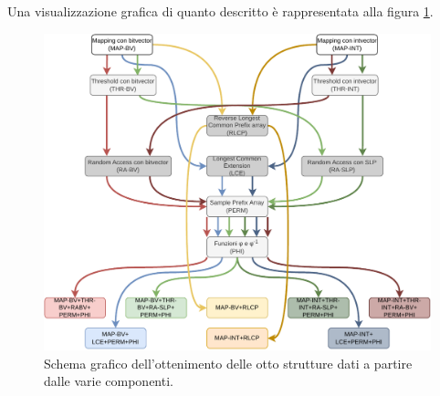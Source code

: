 Una visualizzazione grafica di quanto descritto è rappresentata alla figura
\ref{fig:compon}.
\begin{figure}
  \centering
  \includegraphics[width=\textwidth]{img/ds.pdf}
  \vspace{-5mm}
  \caption{Schema grafico dell'ottenimento delle otto strutture dati a partire
    dalle varie componenti.}
  \label{fig:compon}
\end{figure}
